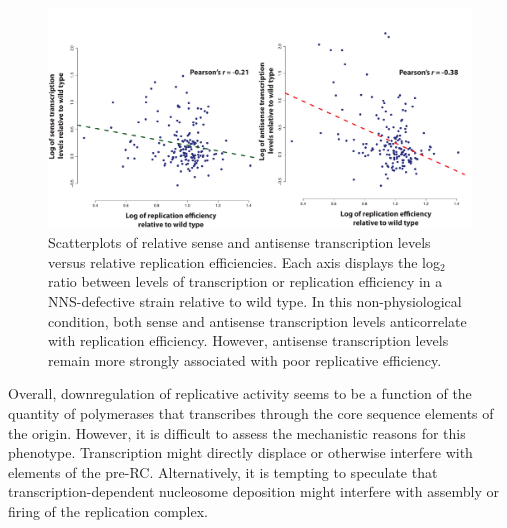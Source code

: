 \begin{figure}[h]

\centering
\includegraphics[width=\textwidth]{figures/results/JScorrelations}
\caption[correlations between transcription and replication efficiency in a NNS defective strain]{Scatterplots of relative sense and antisense transcription levels versus relative replication efficiencies. Each axis displays the log$_2$ ratio between levels of transcription or replication efficiency in a NNS-defective strain relative to wild type. In this non-physiological condition, both sense and antisense transcription levels anticorrelate with replication efficiency. However, antisense transcription levels remain more strongly associated with poor replicative efficiency.}
\label{fig:JS}

\end{figure} 


Overall, downregulation of replicative activity seems to be a function of the quantity of polymerases that transcribes through the core sequence elements of the origin. 
However, it is difficult to assess the mechanistic reasons for this phenotype. 
Transcription might directly displace or otherwise interfere with elements of the pre-RC. 
Alternatively, it is tempting to speculate that transcription-dependent nucleosome deposition might interfere with assembly or firing of the replication complex.

\clearpage
